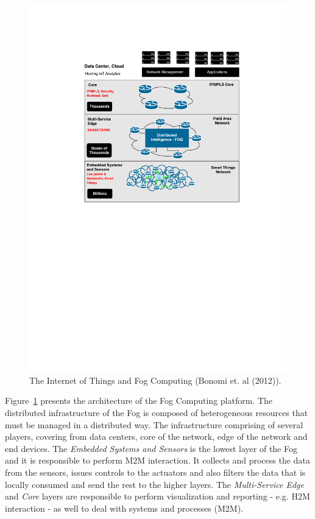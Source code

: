 \begin{figure}[ht!]
  \centering
  \includegraphics[width=.9\textwidth]{./images/fog_architecture}
  \caption{The Internet of Things and Fog Computing (Bonomi et. al (2012)).}
  \label{fig:fog_architecture}
\end{figure}

Figure~\ref{fig:fog_architecture} presents the architecture of the Fog Computing platform.
The distributed infrastructure of the Fog is composed of heterogeneous resources that must be managed
in a distributed way. The infrastructure comprising of several players, covering from data centers,
core of the network, edge of the network and end devices. The \textit{Embedded Systems and Sensors} is
the lowest layer of the Fog and it is responsible to perform \gls{M2M} interaction. It collects and
process the data from the sensors, issues controls to the actuators and also filters the data that
is locally consumed and send the rest to the higher layers. The \textit{Multi-Service Edge} and
\textit{Core} layers are responsible to perform visualization and reporting - e.g. \gls{H2M} interaction -
as well to deal with systems and processes (\gls{M2M}).\\

